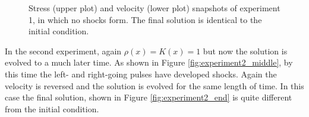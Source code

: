 \begin{figure}
\centerline{
}
\caption{Stress (upper plot) and velocity (lower plot) snapshots of experiment 1, 
in which no shocks form.  The final
solution is identical to the initial condition.\label{fig:experiment1}}
\end{figure}

In the second experiment, again $\rho(x)=K(x)=1$ but now the solution is evolved
to a much later time.  %
As shown in Figure \ref{fig:experiment2_middle}, by this time the left- and 
right-going
pulses have developed shocks.  Again the velocity is reversed and the solution is
evolved for the same length of time.  %
In this case the final solution, shown in Figure \ref{fig:experiment2_end} 
is quite different from the initial condition.

